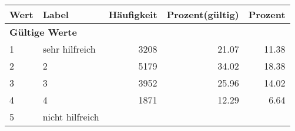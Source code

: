      \begin{longtable}{lXrrr}
     \toprule
     \textbf{Wert} & \textbf{Label} & \textbf{Häufigkeit} & \textbf{Prozent(gültig)} & \textbf{Prozent} \\
     \endhead
     \midrule
     \multicolumn{5}{l}{\textbf{Gültige Werte}}\\

     1 &
     \multicolumn{1}{X}{ sehr hilfreich   } &


       \num{3208} &
       \num[round-mode=places,round-precision=2]{21,07} &
         \num[round-mode=places,round-precision=2]{11,38} \\

     2 &
     \multicolumn{1}{X}{ 2   } &


       \num{5179} &
       \num[round-mode=places,round-precision=2]{34,02} &
         \num[round-mode=places,round-precision=2]{18,38} \\

     3 &
     \multicolumn{1}{X}{ 3   } &


       \num{3952} &
       \num[round-mode=places,round-precision=2]{25,96} &
         \num[round-mode=places,round-precision=2]{14,02} \\

     4 &
     \multicolumn{1}{X}{ 4   } &


       \num{1871} &
       \num[round-mode=places,round-precision=2]{12,29} &
         \num[round-mode=places,round-precision=2]{6,64} \\

     5 &
     \multicolumn{1}{X}{ nicht hilfreich   } &



\end{longtable}
